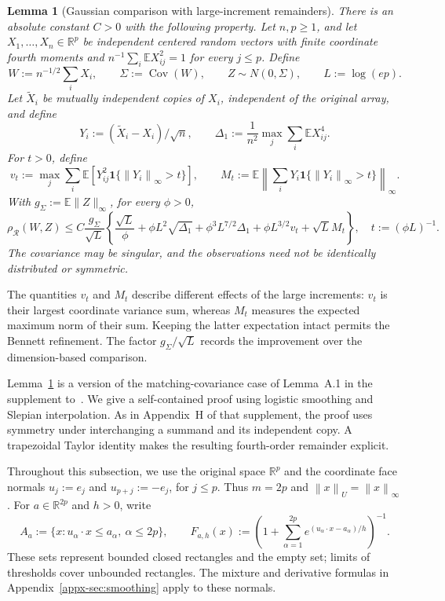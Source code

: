 \documentclass[11pt,letterpaper,twoside,leqno]{article}
\theoremstyle{bookplain}
\newtheorem{lemma}{Lemma}
\theoremstyle{bookremark}
\newcommand{\E}{\mathbb E}
\newcommand{\R}{\mathbb R}
\newcommand{\Cov}{\operatorname{Cov}}
\newcommand{\norm}[1]{\left\lVert#1\right\rVert}
\newcommand{\rh}{\rho_{\mathcal R}}
\newcommand{\ind}{\mathbf 1}
\begin{document}
\begin{lemma}[Gaussian comparison with large-increment remainders]
\label{ben:comparison}
There is an absolute constant $C>0$ with the following property.
Let $n,p\ge1$, and let $X_1,\ldots,X_n\in\R^p$ be independent
centered random vectors with finite coordinate fourth moments and
$n^{-1}\sum_i\E X_{ij}^2=1$ for every $j\le p$. Define
\[
 W:=n^{-1/2}\sum_iX_i,\qquad \Sigma:=\Cov(W),\qquad
 Z\sim N(0,\Sigma),\qquad L:=\log(ep).
\]
Let $\widetilde X_i$ be mutually independent copies of $X_i$,
independent of the original array, and define
\[
 Y_i:=(\widetilde X_i-X_i)/\sqrt n,\qquad
 \Delta_1:=\frac1{n^2}\max_j\sum_i\E X_{ij}^4.
\]
For $t>0$, define
\[
 v_t:=\max_j\sum_i\E[Y_{ij}^2\ind\{\norm{Y_i}_\infty>t\}],
 \qquad M_t:=\E\norm{\sum_iY_i\ind\{\norm{Y_i}_\infty>t\}}_\infty.
\]
With $g_\Sigma:=\E\|Z\|_\infty$, for every $\phi>0$,
\begin{equation}
 \rh(W,Z)\le C\frac{g_\Sigma}{\sqrt L}\left\{
 \frac{\sqrt L}{\phi}+\phi L^2\sqrt{\Delta_1}
 +\phi^3L^{7/2}\Delta_1+\phi L^{3/2}v_t+\sqrt L M_t\right\},
 \quad t:=(\phi L)^{-1}.
 \label{ben:master}
\end{equation}
The covariance may be singular, and the observations need not be
identically distributed or symmetric.
\end{lemma}

The quantities $v_t$ and $M_t$ describe different effects of the
large increments: $v_t$ is their largest coordinate variance sum,
whereas $M_t$ measures the expected maximum norm of their sum.
Keeping the latter expectation intact permits the Bennett refinement.
The factor $g_\Sigma/\sqrt L$ records the improvement over the
dimension-based comparison.

Lemma~\ref{ben:comparison} is a version of the matching-covariance
case of Lemma~A.1 in the supplement to~\cite{CCKK2022}. We give
a self-contained proof using logistic smoothing and Slepian
interpolation. As in Appendix~H of that supplement, the proof uses
symmetry under interchanging a summand and its independent copy.
A trapezoidal Taylor identity makes the resulting fourth-order
remainder explicit.

Throughout this subsection, we use the original space $\R^p$ and
the coordinate face normals $u_j:=e_j$ and $u_{p+j}:=-e_j$,
for $j\le p$. Thus $m=2p$ and $\norm x_U=\norm x_\infty$.
For $a\in\R^{2p}$ and $h>0$, write
\[
 A_a:=\{x:u_\alpha\cdot x\le a_\alpha,\ \alpha\le2p\},\qquad
 F_{a,h}(x):=\left(1+\sum_{\alpha=1}^{2p}
          e^{(u_\alpha\cdot x-a_\alpha)/h}\right)^{-1}.
\]
These sets represent bounded closed rectangles and the empty set;
limits of thresholds cover unbounded rectangles. The mixture and
derivative formulas in Appendix~\ref{appx-sec:smoothing} apply to
these normals.
\end{document}
